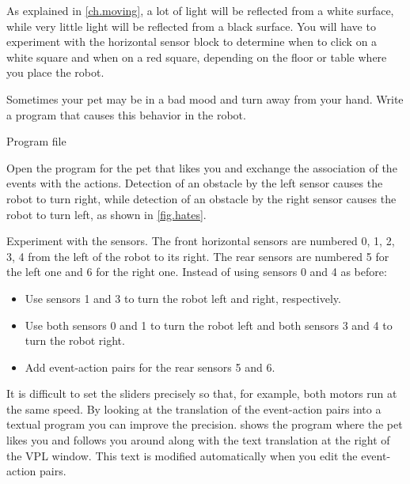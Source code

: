 As explained in \cref{ch.moving}, a lot of light will be reflected
from a white surface, while very little light will be reflected from a
black surface.
You will have to experiment with the horizontal sensor block to determine when to click on a white square and when on a red square, depending on the floor or table where you place the robot.





Sometimes your pet may be in a bad mood and turn away from your hand.
Write a program that causes this behavior in the robot.

{\raggedleft \hfill Program file }

Open the program for the pet that likes you and exchange the association
of the events with the actions. Detection of an obstacle by the left
sensor causes the robot to turn right, while detection of an obstacle by
the right sensor causes the robot to turn left, as shown in \cref{fig.hates}.


{
Experiment with the sensors.
The front horizontal sensors are numbered 0, 1, 2, 3, 4 from the left of the robot to its right.
The rear sensors are numbered 5 for the left one and 6 for the right one.
Instead of using sensors 0 and 4 as before:
\begin{itemize}[noitemsep,nosep,leftmargin=*]
\item Use sensors 1 and 3 to turn the robot left and right,
respectively.
\item Use both sensors 0 and 1 to turn the robot left and both sensors 3
and 4 to turn the robot right.
\item Add event-action pairs for the rear sensors 5 and 6.
\end{itemize}
}


It is difficult to set the sliders precisely so that, for example, both
motors run at the same speed. By looking at the translation of the
event-action pairs into a textual program you can improve the precision.
 shows the program where the pet likes you and follows you around along with the text translation at the right of the VPL window.
This text is modified automatically when you edit the event-action pairs.

